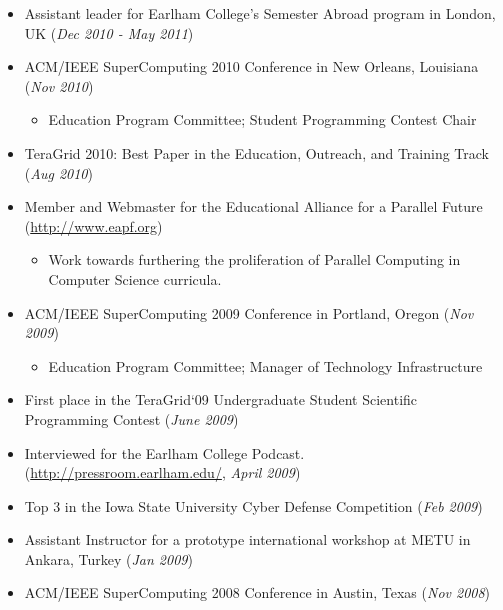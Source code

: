 \documentclass[10pt]{article}
\begin{document}
\begin{itemize}
  \addtolength{\itemsep}{-2mm}
	\item \indent Assistant leader for Earlham College's Semester Abroad program in London, UK (\emph{Dec 2010 - May 2011})
	\item \indent ACM/IEEE SuperComputing 2010 Conference in New Orleans, Louisiana (\emph{Nov 2010})
		\vspace{-2mm}
		\begin{itemize}
			\item \indent Education Program Committee; Student Programming Contest Chair
		\end{itemize}
		\vspace{-1mm}
	\item \indent TeraGrid 2010: Best Paper in the Education, Outreach, and Training Track (\emph{Aug 2010})
	\item \indent Member and Webmaster for the Educational Alliance for a Parallel Future (\url{http://www.eapf.org})
		\vspace{-2mm}
		\begin{itemize}
			\item \indent Work towards furthering the proliferation of Parallel Computing in Computer Science curricula.
		\end{itemize}
		\vspace{-1mm}
  \item \indent ACM/IEEE SuperComputing 2009 Conference in Portland, Oregon (\emph{Nov 2009})
		\vspace{-2mm}
		\begin{itemize}
			\item \indent Education Program Committee; Manager of Technology Infrastructure
		\end{itemize}
		\vspace{-1mm}
	\item \indent First place in the TeraGrid`09 Undergraduate Student Scientific Programming Contest (\emph{June 2009})
	\item \indent Interviewed for the Earlham College Podcast. (\url{http://pressroom.earlham.edu/}, \emph{April 2009})
  \item \indent Top 3 in the Iowa State University Cyber Defense Competition (\emph{Feb 2009})
  \item \indent Assistant Instructor for a prototype international workshop at METU in Ankara, Turkey (\emph{Jan 2009})
  \item \indent ACM/IEEE SuperComputing 2008 Conference in Austin, Texas (\emph{Nov 2008})

\end{itemize}
\end{document}
